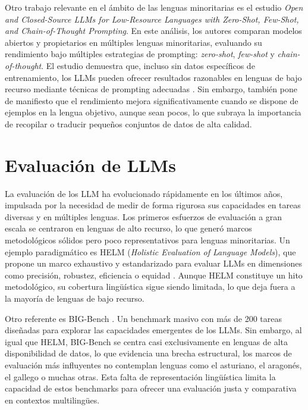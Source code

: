 Otro trabajo relevante en el ámbito de las lenguas minoritarias es el estudio \textit{Open and Closed-Source LLMs for Low-Resource Languages with Zero-Shot, Few-Shot, and Chain-of-Thought Prompting}. En este análisis, los autores comparan modelos abiertos y propietarios en múltiples lenguas minoritarias, evaluando su rendimiento bajo múltiples estrategias de prompting: \textit{zero-shot}, \textit{few-shot} y \textit{chain-of-thought}. El estudio demuestra que, incluso sin datos específicos de entrenamiento, los LLMs pueden ofrecer resultados razonables en lenguas de bajo recurso mediante técnicas de prompting adecuadas \cite{NAZI2025100124}. Sin embargo, también pone de manifiesto que el rendimiento mejora significativamente cuando se dispone de ejemplos en la lengua objetivo, aunque sean pocos, lo que subraya la importancia de recopilar o traducir pequeños conjuntos de datos de alta calidad. 


\section{Evaluación de LLMs}
\label{sec:Evaluacion}

La evaluación de los LLM ha evolucionado rápidamente en los últimos años, impulsada por la necesidad de medir de forma rigurosa sus capacidades en tareas diversas y en múltiples lenguas. Los primeros esfuerzos de evaluación a gran escala se centraron en lenguas de alto recurso, lo que generó marcos metodológicos sólidos pero poco representativos para lenguas minoritarias. Un ejemplo paradigmático es HELM (\textit{Holistic Evaluation of Language Models}), que propone un marco exhaustivo y estandarizado para evaluar LLMs en dimensiones como precisión, robustez, eficiencia o equidad \cite{liang2022helm}. Aunque HELM constituye un hito metodológico, su cobertura lingüística sigue siendo limitada, lo que deja fuera a la mayoría de lenguas de bajo recurso.

Otro referente es BIG-Bench \cite{srivastava2022bigbench}. Un benchmark masivo con más de 200 tareas diseñadas para explorar las capacidades emergentes de los LLMs. Sin embargo, al igual que HELM, BIG-Bench se centra casi exclusivamente en lenguas de alta disponibilidad de datos, lo que evidencia una brecha estructural, los marcos de evaluación más influyentes no contemplan lenguas como el asturiano, el aragonés, el gallego o muchas otras. Esta falta de representación lingüística limita la capacidad de estos benchmarks para ofrecer una evaluación justa y comparativa en contextos multilingües.


